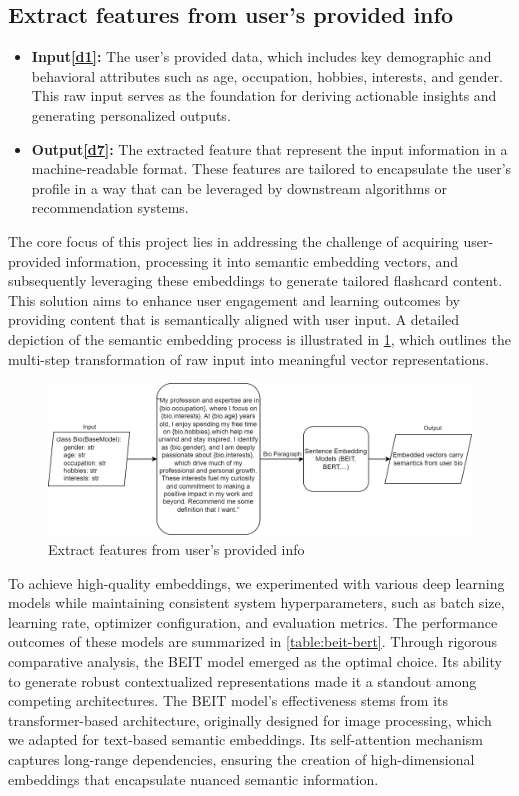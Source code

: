 \documentclass{article}
\begin{document}
\subsection{Extract features from user's provided info}
\begin{itemize}
    \item \textbf{Input\hyperref[sec:input1]{[d1]}:} The user's provided data, which includes key demographic and behavioral attributes such as age, occupation, hobbies, interests, and gender. This raw input serves as the foundation for deriving actionable insights and generating personalized outputs.
    \label{sec:input7}
    \item \textbf{Output\hyperref[sec:input7]{[d7]}:} The extracted feature that represent the input information in a machine-readable format. These features are tailored to encapsulate the user's profile in a way that can be leveraged by downstream algorithms or recommendation systems.
\end{itemize}
The core focus of this project lies in addressing the challenge of acquiring user-provided information, processing it into semantic embedding vectors, and subsequently leveraging these embeddings to generate tailored flashcard content. This solution aims to enhance user engagement and learning outcomes by providing content that is semantically aligned with user input. A detailed depiction of the semantic embedding process is illustrated in \ref{fig:decompose1-embedding-bio}, which outlines the multi-step transformation of raw input into meaningful vector representations.

\begin{figure}[h!]
    \centering
    \includegraphics[width=0.8\linewidth]{decompose1-embedding-bio.png}
    \caption{Extract features from user's provided info}
    \label{fig:decompose1-embedding-bio}
\end{figure}

To achieve high-quality embeddings, we experimented with various deep learning models while maintaining consistent system hyperparameters, such as batch size, learning rate, optimizer configuration, and evaluation metrics. The performance outcomes of these models are summarized in \ref{table:beit-bert}. Through rigorous comparative analysis, the BEIT model emerged as the optimal choice. Its ability to generate robust contextualized representations made it a standout among competing architectures. The BEIT model's effectiveness stems from its transformer-based architecture, originally designed for image processing, which we adapted for text-based semantic embeddings. Its self-attention mechanism captures long-range dependencies, ensuring the creation of high-dimensional embeddings that encapsulate nuanced semantic information.
\end{document}
